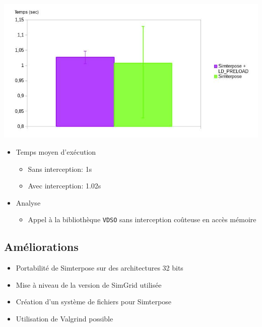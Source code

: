\documentclass[10.5pt]{beamer}
\begin{document}
\begin{frame}{\subsecname}
  
  \centering
      \includegraphics[scale=0.25]{mesures/graph/global_time.jpg}
      \begin{itemize}
      \item Temps moyen d'exécution
        \begin{itemize}
        \item Sans interception: 1s
        \item Avec interception: 1.02s 
        \end{itemize}
  
  \item<2-> Analyse
    \begin{itemize}
    \item<2-> Appel à la bibliothèque \texttt{VDSO} sans interception coûteuse en accès mémoire
    \end{itemize}
  \end{itemize}
\end{frame}

\subsection{Améliorations}
\begin{frame}{\subsecname}
  \begin{itemize}
  \item Portabilité de Simterpose sur des architectures 32 bits
  \item<2-> Mise à niveau de la version de SimGrid utilisée
  \item<3-> Création d'un système de fichiers pour Simterpose
  \item<4-> Utilisation de Valgrind possible
    \end{itemize}
\end{frame}
\end{document}
